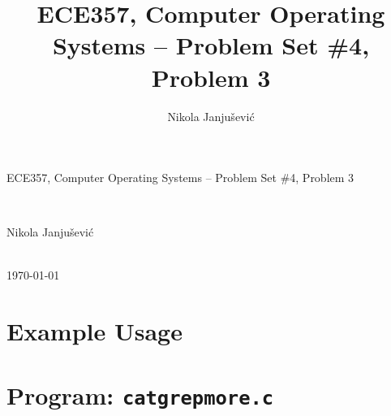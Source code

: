 \documentclass[11pt,a4paper]{article}
\author{Nikola Janju\v{s}evi\'{c}}
\title{ECE357, Computer Operating Systems -- Problem Set \#4, Problem 3}
\begin{document}
\begin{Large}
ECE357, Computer Operating Systems -- Problem Set \#4, Problem 3
\end{Large} \\
\begin{large}
Nikola Janju\v{s}evi\'{c}
\end{large} 
\\
\today

\section{Example Usage}


\pagebreak

\section*{Program: \texttt{catgrepmore.c}}

\end{document}
